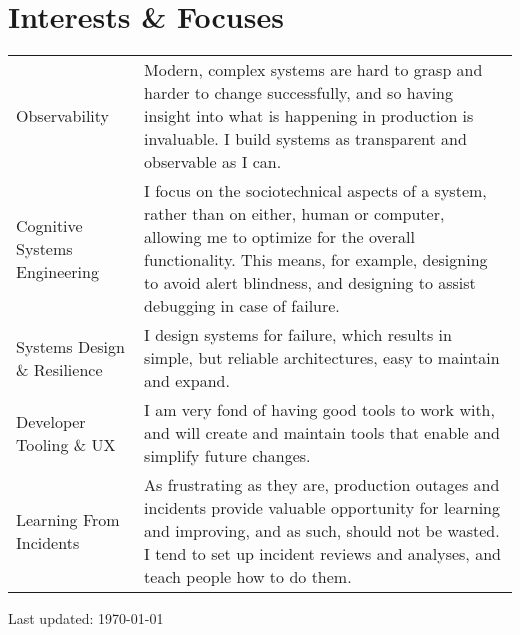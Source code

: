 \documentclass[a4paper]{article}
\begin{document}
\section*{Interests \& Focuses}
\begin{tabular}{ p{3cm} | p{13.75cm} }
  Observability & Modern, complex systems are hard to grasp and harder to change
                  successfully, and so having insight into what is happening in production is
                  invaluable. I build systems as transparent and observable as I
                  can. \\
  Cognitive Systems Engineering & I focus on the sociotechnical aspects of a
                                  system, rather than on either, human or
                                  computer, allowing me to optimize for the
                                  overall functionality. This means, for
                                  example, designing to avoid alert blindness,
                                  and designing to assist debugging in case of failure.\\
  Systems Design \& Resilience & I design systems for failure, which results in simple,
                                 but reliable architectures, easy to maintain and expand.\\
  Developer Tooling \& UX & I am very fond of having good tools to work with, and will create and
                            maintain tools that enable and simplify future
                            changes. \\
  Learning From \vfill Incidents & As frustrating as they are, production outages and
                                   incidents provide valuable opportunity for learning
                                   and improving, and as such, should not be wasted. I
                                   tend to set up incident reviews and analyses, and
                                   teach people how to do them. \\
\end{tabular}

\vfill

\begin{center}
  \begin{footnotesize}
    Last updated: \today
  \end{footnotesize}
\end{center}
\end{document}
